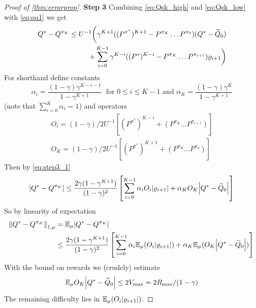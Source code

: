 \begin{proof}[Proof of \cref{thm:errorprop}]
  \textbf{Step 3}
Combining \cref{eq:Qsk_high} and \cref{eq:Qsk_low} with \cref{eq:qq1} we get
  \begin{equation}
    \begin{split}
      Q^* - Q^{\pi_K} \leq U^{-1} \bigg(
	\gamma^{K+1}((P^{\pi^*})^{K+1} - P^{\pi_K} \dots P^{\pi_0})(Q^* - \widetilde{Q}_0)
	\\ + \sum_{i=0}^{K-1} \gamma^{K-i}
      ((P^*)^{K-i} - P^{\pi_K} \dots P^{\pi_{i+1}}) \varrho_{i+1} \bigg)
    \end{split}
    \label{eq:step3_1}
  \end{equation}
  For shorthand define constants
  \begin{equation} \alpha_i = \frac{(1-\gamma) \gamma^{K-i-1}}{1 - \gamma^{K+1}}
    \; \mbox{ for } 0 \leq i \leq K-1 \mbox{ and }
    \alpha_K = \frac{(1-\gamma) \gamma^K}{1 - \gamma^{K+1}}
  \end{equation}
  (note that $\sum_{i=0}^K \alpha_i = 1$) and operators
  \begin{align}
    O_i = (1-\gamma)/2 U^{-1} [(P^{\pi^*})^{K-i}
    + (P^{\pi_K} \dots P^{\pi_{i+1}})]
    \\ O_K = (1-\gamma)/2 U^{-1} [(P^{\pi^*})^{K+1}
    + (P^{\pi_K} \dots P^{\pi_0})]
  \end{align}
  Then by \cref{eq:step3_1}
  \begin{align}
    \abs{Q^* - Q^{\pi_K}} \leq \frac{2 \gamma (1- \gamma^{K+1})}{(1-\gamma)^2}
    \left[ \sum_{i=0}^{K-1} \alpha_i O_i \abs{\varrho_{i+1}}
    + \alpha_K O_K \abs{Q^* - \widetilde{Q}_0} \right]
  \end{align}
  So by linearity of expectation
  \begin{align}
    \norm{Q^* - Q^{\pi_K}}_{1, \mu} &= \mathbb{E}_\mu \abs{Q^* - Q^{\pi_K}}
    \\ &\leq \frac{2 \gamma (1- \gamma^{K+1})}{(1-\gamma)^2}
    \left[ \sum_{i=0}^{K-1} \alpha_i \mathbb{E}_\mu (O_i \abs{\varrho_{i+1}})
    + \alpha_K \mathbb{E}_\mu (O_K \abs{Q^* - \widetilde{Q}_0}) \right]
    \label{eq:step3_final}
  \end{align}
  With the bound on rewards we (crudely) estimate
  \begin{equation}
    \mathbb{E}_\mu O_K \abs{Q^* - \widetilde{Q}_0} \leq 2 V_{\max} = 2 R_{\max} / (1-\gamma)
    \label{eq:step3_crude}
  \end{equation}
  The remaining difficulty lies in $\mathbb{E}_\mu(O_i\abs{\varrho_{i+1}})$.


\end{proof}
